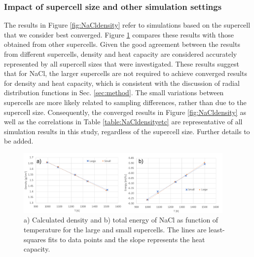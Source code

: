 \documentclass[preprint,3p,10pt,onecolumn,number,sort&compress]{elsarticle}
\begin{document}
\subsubsection{Impact of supercell size and other simulation settings}
The results in Figure \ref{fig:NaCldensity} refer to simulations based on the supercell that we consider best converged. Figure \ref{fig:NaClsize} compares these results with those obtained from other supercells. Given the good agreement between the results from different supercells, density and heat capacity are considered accurately represented by all supercell sizes that were investigated.
 These results suggest that for NaCl, the larger supercells are not required to achieve converged results for density and heat capacity, which is consistent with the discussion of radial distribution functions in Sec. \ref{sec:method}. The small variations between supercells are more likely related to sampling differences, rather than due to the supercell size. Consequently, the converged results in Figure \ref{fig:NaCldensity} as well as the correlations in Table \ref{table:NaCldensityetc} are representative of all simulation results in this study, regardless of the supercell size. {\color{red} Further details to be added.} %

\begin{figure}[htb]
\centering
\includegraphics[width=0.95\textwidth]{FIG3b.pdf}
\caption{a) Calculated density and b) total energy of NaCl as function of temperature for the large and small supercells. The lines are least-squares fits to data points and the slope represents the heat capacity.} 
\label{fig:NaClsize}
\end{figure}

\end{document}

